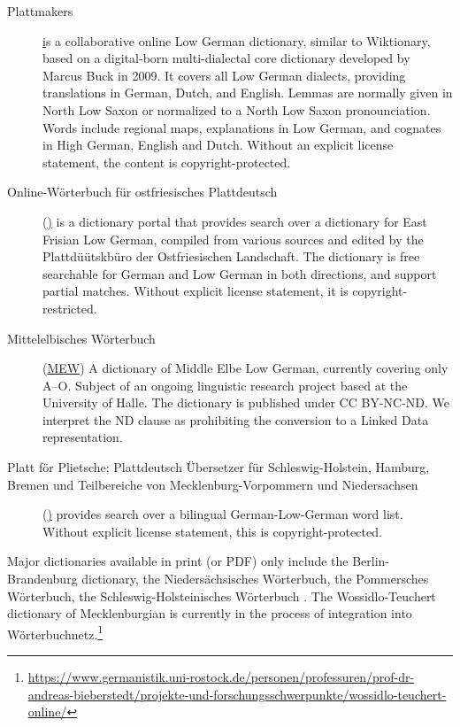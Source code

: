 \documentclass[11pt]{article}
\begin{document}
\begin{description}
\item[Plattmakers] \href{https://plattmakers.de} is a collaborative online Low German dictionary, similar to Wiktionary, based on a digital-born multi-dialectal core dictionary developed by Marcus Buck in 2009. It covers all Low German dialects, providing translations in German, Dutch, and English. Lemmas are normally given in North Low Saxon or normalized to a North Low Saxon pronounciation. Words include regional maps, explanations in Low German, and cognates in High German, English and Dutch. Without an explicit license statement, the content is copyright-protected.

\item[Online-Wörterbuch für ostfriesisches Plattdeutsch] (\href{https://www.platt-wb.de/}) 
    is a dictionary portal that provides search over a dictionary for East Frisian Low German, compiled from various sources and edited by the Plattdüütskbüro der Ostfriesischen Landschaft. The dictionary is free searchable for German and Low German in both directions, and support partial matches. Without explicit license statement, it is copyright-restricted.

\item[Mittelelbisches Wörterbuch] (\href{https://mew.uzi.uni-halle.de/artikel/25748}{MEW})
    A dictionary of Middle Elbe Low German, currently covering only A–O. Subject of an ongoing linguistic research project based at the University of Halle.  The dictionary is published under CC BY-NC-ND. We interpret the ND clause as prohibiting the conversion to a Linked Data representation.

\item[Platt för Plietsche; Plattdeutsch Übersetzer für Schleswig-Holstein, Hamburg, Bremen und Teilbereiche von Mecklenburg-Vorpommern und Niedersachsen] (\href{https://www.plattdeutsches-woerterbuch.de/}) provides search over a bilingual German-Low-German word list. Without explicit license statement, this is copyright-protected.



\end{description}

Major dictionaries available in print (or PDF) only include the Berlin-Brandenburg dictionary, the Niedersächsisches Wörterbuch, the Pommersches Wörterbuch, the Schleswig-Holsteinisches Wörterbuch \cite{mensingotto}. The Wossidlo-Teuchert dictionary of Mecklenburgian is currently in the process of integration into Wörterbuchnetz.\footnote{\url{https://www.germanistik.uni-rostock.de/personen/professuren/prof-dr-andreas-bieberstedt/projekte-und-forschungsschwerpunkte/wossidlo-teuchert-online/}}
\end{document}
